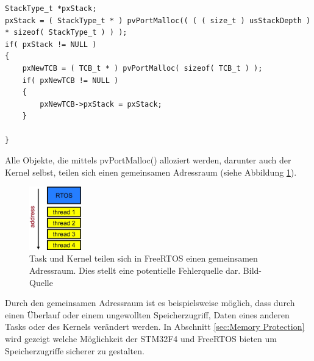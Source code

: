 \begin{lstlisting}[caption={FreeRTOS Source von xTaskCreate() aus Task.c. Jeder Task besitzt einen Stack und einen Task Control Block, beide werden beim Aufruf von xTaskCreate (Zeile 5 und Zeile 11) erstellt.}, linewidth=8cm,captionpos=b, label=lst:xTaskCreate, float=htb]
StackType_t *pxStack;
pxStack = ( StackType_t * ) pvPortMalloc(( ( ( size_t ) usStackDepth ) 
* sizeof( StackType_t ) ) );
if( pxStack != NULL )
{
	pxNewTCB = ( TCB_t * ) pvPortMalloc( sizeof( TCB_t ) );
	if( pxNewTCB != NULL )
	{
		pxNewTCB->pxStack = pxStack;
	}

}
\end{lstlisting}
Alle Objekte, die mittels pvPortMalloc() alloziert werden, darunter auch der Kernel selbst, teilen sich einen gemeinsamen Adressraum (siehe Abbildung \ref{fig:AddressSpace}). 
\begin{figure}[hbt]
	\centering
		\includegraphics[width=0.2\textwidth]{Pictures/EmbeddedCom/addressSpace.jpg}
	\caption{Task und Kernel teilen sich in FreeRTOS einen gemeinsamen Adressraum. Dies stellt eine potentielle Fehlerquelle dar. Bild-Quelle~\protect{}}
	\label{fig:AddressSpace}
\end{figure} 
Durch den gemeinsamen Adressraum ist es beispielsweise mög\-lich, dass durch einen Überlauf oder einem ungewollten Speicherzugriff, Daten eines anderen Tasks oder des Kernels ver\-än\-dert werden.   
In Abschnitt \ref{sec:Memory Protection} wird gezeigt welche Mög\-lich\-keit der STM32F4 und FreeRTOS bieten um Speicherzugriffe sicherer zu gestalten.    
